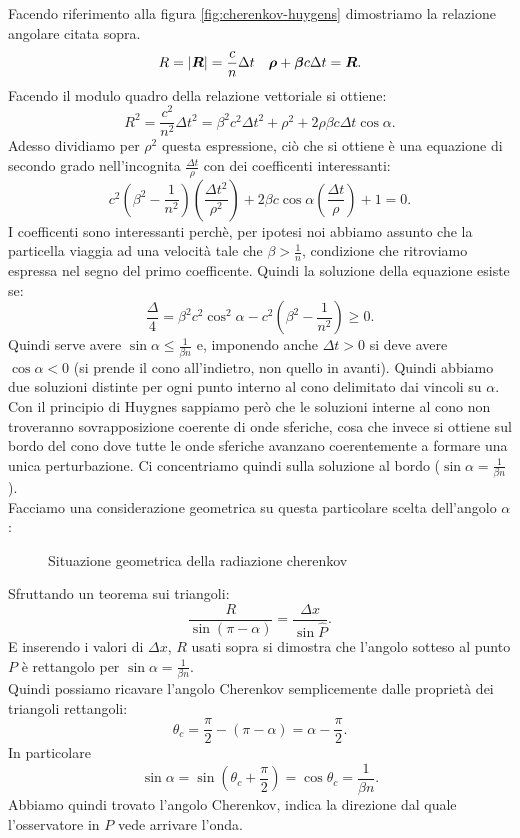 Facendo riferimento alla figura \ref{fig:cherenkov-huygens} dimostriamo la relazione angolare citata sopra.
\begin{align*}
	&R = \left| \boldsymbol{R} \right| = \frac{c}{n} \Delta t	&\boldsymbol{\rho} + \boldsymbol{\beta} c \Delta t=\boldsymbol{R} 
.\end{align*}
Facendo il modulo quadro della relazione vettoriale si ottiene:
\[
	R^2=\frac{c^2}{n^2}\Delta t^2=\beta^2c^2\Delta t^2 + \rho^2 + 2\rho\beta c\Delta t \cos\alpha 
.\] 
Adesso dividiamo per $\rho^2$ questa espressione, ciò che si ottiene è una equazione di secondo grado nell'incognita $\frac{\Delta t}{\rho}$ con dei coefficenti interessanti:
\[
	c^2\left( \beta^2- \frac{1}{n^2} \right) \left( \frac{\Delta t^2}{\rho^2} \right) + 2\beta c \cos\alpha\left( \frac{\Delta t}{\rho} \right) +1=0
.\] 
I coefficenti sono interessanti perchè, per ipotesi noi abbiamo assunto che la particella viaggia ad una velocità tale che $\beta>\frac{1}{n}$, condizione che ritroviamo espressa nel segno del primo coefficente. Quindi la soluzione della equazione esiste se:
\[
	\frac{\Delta}{4}=\beta^2c^2\cos^2\alpha - c^2\left( \beta^2-\frac{1}{n^2} \right) \ge 0
.\] 
Quindi serve avere $\sin\alpha\le \frac{1}{\beta n}$ e, imponendo anche $\Delta t>0$ si deve avere $\cos\alpha<0$ (si prende il cono all'indietro, non quello in avanti).
Quindi abbiamo due soluzioni distinte per ogni punto interno al cono delimitato dai vincoli su $\alpha$.\\
Con il principio di Huygnes sappiamo però che le soluzioni interne al cono non troveranno sovrapposizione coerente di onde sferiche, cosa che invece si ottiene sul bordo del cono dove tutte le onde sferiche avanzano coerentemente a formare una unica perturbazione.
Ci concentriamo quindi sulla soluzione al bordo ($\sin \alpha = \frac{1}{\beta n}$).\\
Facciamo una considerazione geometrica su questa particolare scelta dell'angolo $\alpha$:
\begin{figure}[H]
    \centering
    \caption{Situazione geometrica della radiazione cherenkov}
    \label{fig:geometria-cherenkov}
\end{figure}
Sfruttando un teorema sui triangoli:
\[
	\frac{R}{\sin\left( \pi-\alpha \right) }= \frac{\Delta x}{\sin\hat{P}}
.\]
E inserendo i valori di $\Delta x$, $R$ usati sopra si dimostra che l'angolo sotteso al punto $P$ è rettangolo per $\sin\alpha= \frac{1}{\beta n}$.\\
Quindi possiamo ricavare l'angolo Cherenkov semplicemente dalle proprietà dei triangoli rettangoli:
\[
	\theta_{c}=\frac{\pi}{2}-\left( \pi-\alpha \right) = \alpha-\frac{\pi}{2}
.\] 
In particolare
\[
	\sin\alpha =\sin\left( \theta_{c}+ \frac{\pi}{2} \right) = \cos\theta_{c}=\frac{1}{\beta n}
.\] 
Abbiamo quindi trovato l'angolo Cherenkov, indica la direzione dal quale l'osservatore in $P$ vede arrivare l'onda.



